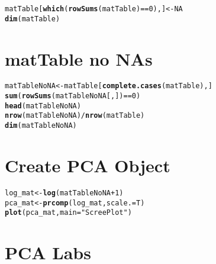 \documentclass{article}\usepackage{graphicx, color}
\makeatletter
\newcommand{\hlfunctioncall}[1]{\textcolor[rgb]{0.501960784313725,0,0.329411764705882}{\textbf{#1}}}%
\newcommand{\hlstring}[1]{\textcolor[rgb]{0.6,0.6,1}{#1}}%
\newenvironment{kframe}{%
 \def\at@end@of@kframe{}%
 \ifinner\ifhmode%
  \def\at@end@of@kframe{\end{minipage}}%
  \begin{minipage}{\columnwidth}%
 \fi\fi%
 \def\FrameCommand##1{\hskip\@totalleftmargin \hskip-\fboxsep
 \colorbox{shadecolor}{##1}\hskip-\fboxsep
     \hskip-\linewidth \hskip-\@totalleftmargin \hskip\columnwidth}%
 \MakeFramed {\advance\hsize-\width
   \@totalleftmargin\z@ \linewidth\hsize
   \@setminipage}}%
 {\par\unskip\endMakeFramed%
 \at@end@of@kframe}
\newenvironment{knitrout}{}{} %
\makeatother
\begin{document}
\begin{knitrout}
\color{fgcolor}\begin{kframe}
\begin{alltt}
matTable[\hlfunctioncall{which}(\hlfunctioncall{rowSums}(matTable) == 0), ] <- NA
\hlfunctioncall{dim}(matTable)
\end{alltt}
\end{kframe}
\end{knitrout}


\section{matTable no NAs}

\begin{knitrout}
\color{fgcolor}\begin{kframe}
\begin{alltt}
matTableNoNA <- matTable[\hlfunctioncall{complete.cases}(matTable), ]
\hlfunctioncall{sum}(\hlfunctioncall{rowSums}(matTableNoNA[, ]) == 0)
\hlfunctioncall{head}(matTableNoNA)
\hlfunctioncall{nrow}(matTableNoNA)/\hlfunctioncall{nrow}(matTable)
\hlfunctioncall{dim}(matTableNoNA)
\end{alltt}
\end{kframe}
\end{knitrout}


\section{Create PCA Object}

\begin{knitrout}
\color{fgcolor}\begin{kframe}
\begin{alltt}
log_mat <- \hlfunctioncall{log}(matTableNoNA + 1)
pca_mat <- \hlfunctioncall{prcomp}(log_mat, scale. = T)
\hlfunctioncall{plot}(pca_mat, main = \hlstring{"Scree Plot"})
\end{alltt}
\end{kframe}
\end{knitrout}


\section{PCA Labs}
\end{document}
